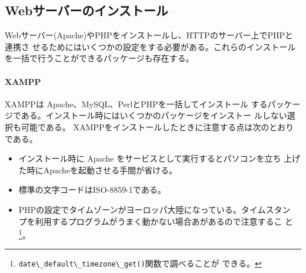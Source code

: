 \subsection{Webサーバーのインストール}
Webサーバー(Apache)やPHPをインストールし、HTTPのサーバー上でPHPと連携さ
せるためにはいくつかの設定をする必要がある。これらのインストール
を一括で行うことができるパッケージも存在する。
\paragraph{XAMPP}XAMPPは Apache、MySQL、PerlとPHPを一括してインストール
するパッケージである。インストール時にはいくつかのパッケージをインストー
ルしない選択も可能である。%
XAMPPをインストールしたときに注意する点は次のとおりである。
\begin{itemize}
 \item インストール時に Apache をサービスとして実行するとパソコンを立ち
       上げた時にApacheを起動させる手間が省ける。
 \item 標準の文字コードはISO-8859-1である。
 \item PHPの設定でタイムゾーンがヨーロッパ大陸になっている。タイムスタン
       プを利用するプログラムがうまく動かない場合あがあるので注意するこ
       と\footnote{\Verb+date\_default\_timezone\_get()+関数で調べることが
       できる。}。
\end{itemize}





